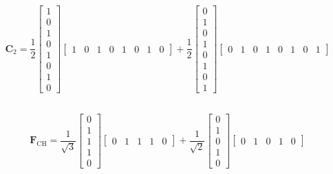 \documentclass[]{article}
\begin{document}
\begin{equation}
	\bm{C}_2 = \frac{1}{2} \begin{bmatrix}
	1 \\
	0 \\
	1 \\
	0 \\
	1 \\
	0 \\
	1 \\
	0
	\end{bmatrix} \begin{bmatrix}
	1 & 0 & 1 & 0 & 1 & 0 & 1 & 0
	\end{bmatrix}
	+
	\frac{1}{2} \begin{bmatrix}
	0 \\
	1 \\
	0 \\
	1 \\
	0 \\
	1 \\
	0 \\
	1
	\end{bmatrix} \begin{bmatrix}
	0 & 1 & 0 & 1 & 0 & 1 & 0 & 1
	\end{bmatrix}
\end{equation}

\subsection{}

\subsubsection{}

\begin{equation}
	\bm{F}_{\text{CH}} = \frac{1}{\sqrt{3}} \begin{bmatrix}
	0 \\
	1 \\
	1 \\
	1 \\
	0
	\end{bmatrix} \begin{bmatrix}
	0 & 1 & 1 & 1 & 0
	\end{bmatrix}
	+
	\frac{1}{\sqrt{2}} \begin{bmatrix}
	0 \\
	1 \\
	0 \\
	1 \\
	0
	\end{bmatrix} \begin{bmatrix}
	0 & 1 & 0 & 1 & 0
	\end{bmatrix}
\end{equation}
\end{document}
